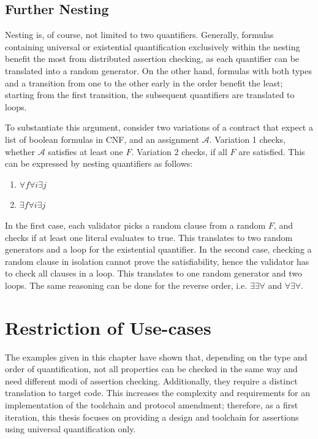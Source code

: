 \subsection{Further Nesting}
Nesting is, of course, not limited to two quantifiers. Generally, formulas containing universal or existential quantification exclusively within the nesting benefit the most from distributed assertion checking, as each quantifier can be translated into a random generator. On the other hand, formulas with both types and a transition from one to the other early in the order benefit the least; starting from the first transition, the subsequent quantifiers are translated to loops.

To substantiate this argument, consider two variations of a contract that expect a list of boolean formulas in CNF, and an assignment $\mathcal{A}$. Variation 1 checks, whether $\mathcal{A}$ satisfies at least one $F$. Variation 2 checks, if all $F$ are satisfied. This can be expressed by nesting quantifiers as follows: 
\begin{enumerate}
\item $\forall f \forall i \exists j$
\item $\exists f \forall i \exists j$
\end{enumerate}
In the first case, each validator picks a random clause from a random $F$, and checks if at least one literal evaluates to true. This translates to two random generators and a loop for the existential quantifier. In the second case, checking a random clause in isolation cannot prove the satisfiability, hence the validator has to check all clauses in a loop. This translates to one random generator and two loops. The same reasoning can be done for the reverse order, i.e. $\exists\exists\forall$ and $\forall\exists\forall$.

\section{Restriction of Use-cases}\label{sec:restrict}
The examples given in this chapter have shown that, depending on the type and order of quantification, not all properties can be checked in the same way and need different modi of assertion checking. Additionally, they require a distinct translation to target code. This increases the complexity and requirements for an implementation of the toolchain and protocol amendment; therefore, as a first iteration, this thesis focuses on providing a design and toolchain for assertions using universal quantification only.

